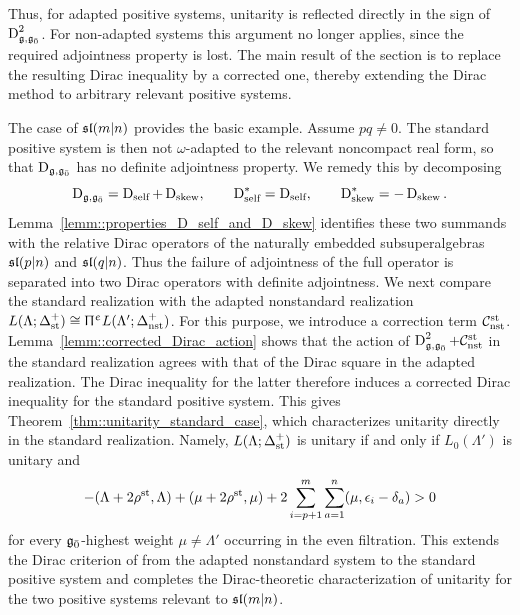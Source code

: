 Thus, for adapted positive systems, unitarity is reflected directly in the sign of $\Dirac_{\gg,\even}^{2}$. For non-adapted systems this argument no longer applies, since the required adjointness property is lost. The main result of the section is to replace the resulting Dirac inequality by a corrected one, thereby extending the Dirac method to arbitrary relevant positive systems.

The case of $\sl(m\vert n)$ provides the basic example. Assume $pq\neq0$. The standard positive system is then not $\omega$-adapted to the relevant noncompact real form, so that $\Dirac_{\gg,\even}$ has no definite adjointness property. We remedy this by decomposing
\begin{equation}
\Dirac_{\gg,\even}=\Dirac_{\self}+\Dirac_{\skew},
\qquad
\Dirac_{\self}^{\ast}=\Dirac_{\self},
\qquad
\Dirac_{\skew}^{\ast}=-\Dirac_{\skew}.
\end{equation}
Lemma~\ref{lemm::properties_D_self_and_D_skew} identifies these two summands with the relative Dirac operators of the naturally embedded subsuperalgebras $\sl(p\vert n)$ and $\sl(q\vert n)$. Thus the failure of adjointness of the full operator is separated into two Dirac operators with definite adjointness. We next compare the standard realization with the adapted nonstandard realization
$L(\Lambda;\Delta_{\st}^{+})\cong
\Uppi^{\upepsilon}L(\Lambda';\Delta_{\nst}^{+})$.
For this purpose, we introduce a correction term $\mathcal C_{\nst}^{\st}$. Lemma~\ref{lemm::corrected_Dirac_action} shows that the action of
$\Dirac_{\gg,\even}^{2}+\mathcal C_{\nst}^{\st}$ in the standard realization agrees with that of the Dirac square in the adapted realization. The Dirac inequality for the latter therefore induces a corrected Dirac inequality for the standard positive system. This gives Theorem~\ref{thm::unitarity_standard_case}, which characterizes unitarity directly in the standard realization. Namely, $L(\Lambda;\Delta_{\st}^{+})$ is unitary if and only if $L_0(\Lambda')$ is unitary and
\begin{equation}
-(\Lambda+2\rho^{\st},\Lambda)
+(\mu+2\rho^{\st},\mu)
+
2\sum_{i=p+1}^{m}\sum_{a=1}^{n}
(\mu,\epsilon_i-\delta_a)> 0
\end{equation}
for every $\even$-highest weight $\mu\neq\Lambda'$ occurring in the even filtration. This extends the Dirac criterion of \cite{SchmidtDirac} from the adapted nonstandard system to the standard positive system and completes the Dirac-theoretic characterization of unitarity for the two positive systems relevant to $\sl(m\vert n)$.


